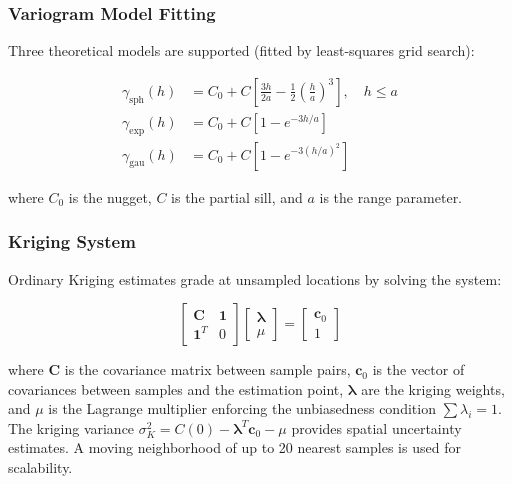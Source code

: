 \documentclass[12pt,a4paper]{article}
\begin{document}
\subsubsection{Variogram Model Fitting}

Three theoretical models are supported (fitted by least-squares grid search):

\begin{align}
    \gamma_{\text{sph}}(h) &= C_0 + C \left[ \frac{3h}{2a} - \frac{1}{2}\left(\frac{h}{a}\right)^3 \right], \quad h \leq a \\
    \gamma_{\text{exp}}(h) &= C_0 + C \left[ 1 - e^{-3h/a} \right] \\
    \gamma_{\text{gau}}(h) &= C_0 + C \left[ 1 - e^{-3(h/a)^2} \right]
\end{align}

where $C_0$ is the nugget, $C$ is the partial sill, and $a$ is the range parameter.

\subsubsection{Kriging System}

Ordinary Kriging estimates grade at unsampled locations by solving the system:

\begin{equation}
    \begin{bmatrix} \mathbf{C} & \mathbf{1} \\ \mathbf{1}^T & 0 \end{bmatrix}
    \begin{bmatrix} \boldsymbol{\lambda} \\ \mu \end{bmatrix}
    =
    \begin{bmatrix} \mathbf{c}_0 \\ 1 \end{bmatrix}
\end{equation}

where $\mathbf{C}$ is the covariance matrix between sample pairs, $\mathbf{c}_0$ is the vector of covariances between samples and the estimation point, $\boldsymbol{\lambda}$ are the kriging weights, and $\mu$ is the Lagrange multiplier enforcing the unbiasedness condition $\sum \lambda_i = 1$. The kriging variance $\sigma^2_K = C(0) - \boldsymbol{\lambda}^T \mathbf{c}_0 - \mu$ provides spatial uncertainty estimates. A moving neighborhood of up to 20 nearest samples is used for scalability.

\end{document}
